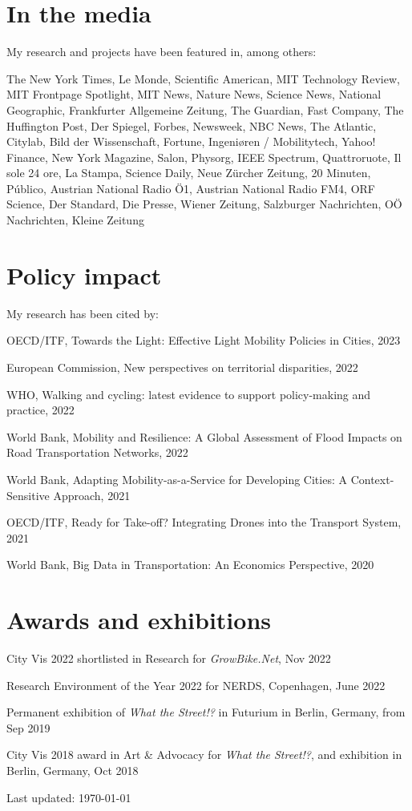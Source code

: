 \documentclass[10pt,a4paper]{article}
\renewenvironment{itemize}{
  \begin{list}{}{
    \setlength{\leftmargin}{1.5em}
    \setlength{\itemsep}{0.25em}
    \setlength{\parskip}{0pt}
    \setlength{\parsep}{0.25em}
  }
}{
  \end{list}
}
\begin{document}
\section*{In the media}
My research and projects have been featured in, among others:
\begin{itemize}
\item{The New York Times, Le Monde, Scientific American, MIT Technology Review, MIT Frontpage Spotlight, MIT News, Nature News, Science News, National Geographic, Frankfurter Allgemeine Zeitung, The Guardian, Fast Company, The Huffington Post, Der Spiegel, Forbes, Newsweek, NBC News, The Atlantic, Citylab, Bild der Wissenschaft, Fortune, Ingeniøren / Mobilitytech, Yahoo! Finance, New York Magazine, Salon, Physorg, IEEE Spectrum, Quattroruote, Il sole 24 ore, La Stampa, Science Daily, Neue Z\"urcher Zeitung, 20 Minuten, Público, Austrian National Radio \"O1, Austrian National Radio FM4, ORF Science, Der Standard, Die Presse, Wiener Zeitung, Salzburger Nachrichten, O{\"O} Nachrichten, Kleine Zeitung}
\end{itemize}


\section*{Policy impact}
My research has been cited by:
\begin{itemize}
\item{OECD/ITF, Towards the Light: Effective Light Mobility Policies in Cities, 2023}
\item{European Commission, New perspectives on territorial disparities, 2022}
\item{WHO, Walking and cycling: latest evidence to support policy-making and practice, 2022}
\item{World Bank, Mobility and Resilience: A Global Assessment of Flood Impacts on Road Transportation Networks, 2022}
\item{World Bank, Adapting Mobility-as-a-Service for Developing Cities: A Context-Sensitive Approach, 2021}
\item{OECD/ITF, Ready for Take-off? Integrating Drones into the Transport System, 2021}
\item{World Bank, Big Data in Transportation: An Economics Perspective, 2020}
\end{itemize}

\section*{Awards and exhibitions}
\begin{itemize} 
\item{City Vis 2022 shortlisted in Research for \emph{GrowBike.Net}, Nov 2022}
\item{Research Environment of the Year 2022 for NERDS, Copenhagen, June 2022}
\item{Permanent exhibition of \emph{What the Street!?} in Futurium in Berlin, Germany, from Sep 2019}
\item{City Vis 2018 award in Art \& Advocacy for \emph{What the Street!?}, and exhibition in Berlin, Germany, Oct 2018}
\end{itemize}

\bigskip

\begin{center}
  \begin{small}
    Last updated: \today
  \end{small}
\end{center}
\end{document}
